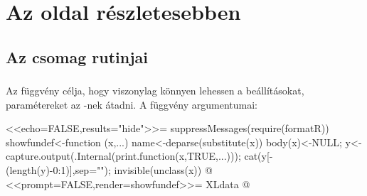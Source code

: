 \chapter{Az  oldal részletesebben}\label{chap:7}

\section{Az  csomag rutinjai}\label{sec:7.1}

\subsection{}

Az  függvény célja, hogy viszonylag könnyen lehessen a
beállításokat, paramétereket az -nek átadni. A függvény
argumentumai:
\begin{Rnw}
<<echo=FALSE,results="hide">>=
suppressMessages(require(formatR))
showfundef<-function (x,...){
  name<-deparse(substitute(x))
  body(x)<-NULL;
  y<-capture.output(.Internal(print.function(x,TRUE,...)));
  cat(y[-(length(y)-0:1)],sep="\n");
  invisible(unclass(x))
}
@
<<prompt=FALSE,render=showfundef>>=
XLdata
@
\end{Rnw}
